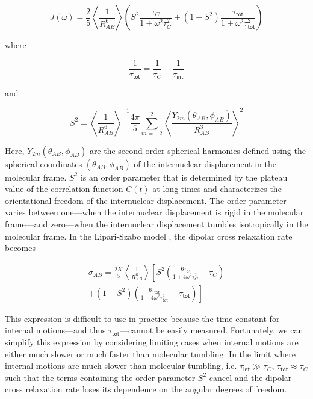 \documentclass[9pt,review,pubversion]{livecoms}
\begin{document}
\begin{equation}
\label{eqn:ls_spectral_density}
J(\omega) = \frac {2} {5} \left \langle \frac {1} {R_{AB}^6} \right \rangle \left( S^2 \frac {\tau_C} {1 + \omega^2 \tau_C^2} + \left( 1 - S^2 \right) \frac {\tau_{\mathsf{tot}}} {1 + \omega^2 \tau_{\mathsf{tot}}^2} \right)
\end{equation}

\noindent where

\begin{equation}
\label{eqn:ls_total_tumbling}
\frac {1} {\tau_{\mathsf{tot}}} = \frac {1} {\tau_C} + \frac {1} {\tau_{\mathsf{int}}}
\end{equation}

\noindent and

\begin{equation}
\label{eqn:ls_order_parameter}
S^2 = \left \langle \frac {1} {R_{AB}^6} \right \rangle^{-1} \frac {4 \pi} {5} \sum_{m=-2}^2 \left \langle \frac {Y_{2m}(\theta_{AB}, \phi_{AB})} {R_{AB}^3} \right \rangle^2
\end{equation}

\noindent Here, $Y_{2m}(\theta_{AB}, \phi_{AB})$ are the second-order spherical harmonics defined using the spherical coordinates $(\theta_{AB}, \phi_{AB})$ of the internuclear displacement in the molecular frame.
$S^2$ is an order parameter that is determined by the plateau value of the correlation function $C(t)$ at long times and characterizes the orientational freedom of the internuclear displacement.
The order parameter varies between one---when the internuclear displacement is rigid in the molecular frame---and zero---when the internuclear displacement tumbles isotropically in the molecular frame.
In the Lipari-Szabo model \cite{lipari_model-free_1982}, the dipolar cross relaxation rate becomes

\begin{equation}
\label{eqn:ls_cross_relaxation}
\begin{gathered}
\sigma_{AB} = \frac {2 K} {5} \left \langle \frac {1} {R_{AB}^6} \right \rangle \left[ S^2 \left( \frac {6 \tau_C} {1 + 4 \omega^2 \tau_C^2} - \tau_C \right) \right. \\
\left. + (1 - S^2) \left( \frac {6 \tau_{\mathsf{tot}}} {1 + 4 \omega^2 \tau_{\mathsf{tot}}^2} - \tau_{\mathsf{tot}} \right) \right]
\end{gathered}
\end{equation}

This expression is difficult to use in practice because the time constant for internal motions---and thus $\tau_{\mathsf{tot}}$---cannot be easily measured.
Fortunately, we can simplify this expression by considering limiting cases when internal motions are either much slower or much faster than molecular tumbling.
In the limit where internal motions are much slower than molecular tumbling, i.e. $\tau_{\mathsf{int}} \gg \tau_C$, $\tau_{\mathsf{tot}} \approx \tau_C$ such that the terms containing the order parameter $S^2$ cancel and the dipolar cross relaxation rate loses its dependence on the angular degrees of freedom.
\end{document}

